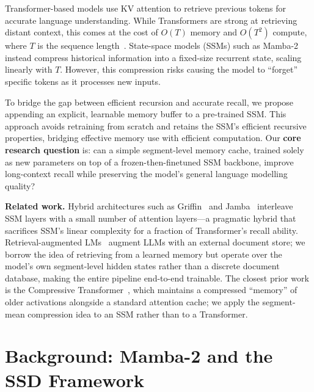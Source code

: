 \documentclass[conference]{IEEEtran}
\begin{document}
Transformer-based models use KV attention to retrieve previous tokens for accurate language understanding. While Transformers are strong at retrieving distant context, this comes at the cost of $O(T)$ memory and $O(T^2)$ compute, where $T$ is the sequence length~\cite{dao2024transformersssmsgeneralizedmodels}. State-space models (SSMs) such as Mamba-2 instead compress historical information into a fixed-size recurrent state, scaling linearly with $T$. However, this compression risks causing the model to ``forget'' specific tokens as it processes new inputs.

To bridge the gap between efficient recursion and accurate recall, we propose appending an explicit, learnable memory buffer to a pre-trained SSM. This approach avoids retraining from scratch and retains the SSM's efficient recursive properties, bridging effective memory use with efficient computation. Our \textbf{core research question} is: can a simple segment-level memory cache, trained solely as new parameters on top of a frozen-then-finetuned SSM backbone, improve long-context recall while preserving the model's general language modelling quality?

\textbf{Related work.}
Hybrid architectures such as Griffin~\cite{de2024griffinmixinggatedlinear} and Jamba~\cite{lieber2024jambahybridtransformermambalanguage} interleave SSM layers with a small number of attention layers---a pragmatic hybrid that sacrifices SSM's linear complexity for a fraction of Transformer's recall ability. Retrieval-augmented LMs~\cite{lewis2021retrievalaugmentedgenerationknowledgeintensivenlp} augment LLMs with an external document store; we borrow the idea of retrieving from a learned memory but operate over the model's own segment-level hidden states rather than a discrete document database, making the entire pipeline end-to-end trainable. The closest prior work is the Compressive Transformer~\cite{rae2019compressivetransformerslongrangesequence}, which maintains a compressed ``memory'' of older activations alongside a standard attention cache; we apply the segment-mean compression idea to an SSM rather than to a Transformer.

\section{Background: Mamba-2 and the SSD Framework}
\end{document}
